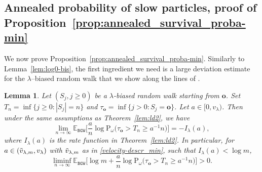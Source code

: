 \documentclass[11 pt]{article}
\newtheorem{lemma}[theorem]{Lemma}
\theoremstyle{definition}
\numberwithin{equation}{section}
\newcommand{\EE}{\mathbb{E}} %
\newcommand{\rt}{\mathbf{o}} %
\newcommand{\Pws}{\mathrm{P}_{\omega}} %
\begin{document}
\subsection{Annealed probability of slow particles, proof of Proposition~\ref{prop:annealed_survival_proba-min}}\label{sec:annealed_min}

We now prove Proposition~\ref{prop:annealed_survival_proba-min}. 
Similarly to Lemma~\ref{lem:log0-bis}, the first ingredient we need is a large deviation estimate for the $\lambda$--biased random walk that we show along the lines of \cite{DGPZ-ld}. 

\begin{lemma}\label{lem:log-min}
	Let $(S_j, j\ge 0)$ be a $\lambda$-biased random walk starting from $\rt$. 
	Set $T_n = \inf\{j\ge 0\colon |S_j|=n  \}$ and $\tau_{\rt} = \inf\{j> 0\colon S_j = \rt  \}$. 
	Let $a \in [0, v_\lambda)$. Then under the same assumptions as Theorem~\ref{lem:ld2}, we have 
		\begin{equation*}
		\lim_{n\to \infty}\EE_{\mathtt{BGW}} \Big[ \frac{a}{n}\log \Pws\big(\tau_{\rt}> T_{n} \ge a^{-1}  n\big) \Big]  = - I_{\lambda}(a),
	\end{equation*}
where $I_{\lambda}(a)$ is the rate function in Theorem~\ref{lem:ld2}. 
	In particular, for $a \in (\Tilde{v}_{\lambda,m}, v_\lambda)$ with $\Tilde{v}_{\lambda,m}$ as in \eqref{velocity-descr_min}, such that  $I_{\lambda}(a) < \log m$, 
	\begin{equation}
		\liminf_{n\to \infty}\EE_{\mathtt{BGW}} \Big[ \log m + \frac{a}{n}\log \Pws\big(\tau_{\rt} > T_{n} \ge a^{-1}  n\big) \Big] >0. 
	\end{equation}
\end{lemma}
\end{document}
